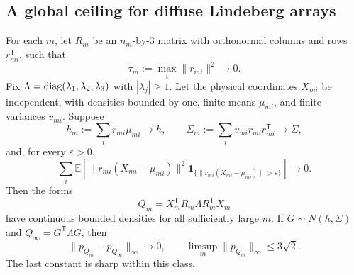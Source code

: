 \subsection{A global ceiling for diffuse Lindeberg arrays}

\begin{theorem}
\label{bench:lindeberg}
For each \(m\), let \(R_m\) be an \(n_m\)-by-\(3\) matrix with
orthonormal columns and rows \(r_{mi}^{\mathsf T}\), such that
\[
 \tau_m:=\max_i\|r_{mi}\|^2\longrightarrow0.
\]
Fix \(\Lambda=\operatorname{diag}(\lambda_1,\lambda_2,\lambda_3)\) with
\(|\lambda_j|\geq1\).  Let the physical coordinates \(X_{mi}\) be
independent, with densities bounded by one, finite means \(\mu_{mi}\),
and finite variances \(v_{mi}\).  Suppose
\begin{equation}\label{bench:lindeberg-limits}
 h_m:=\sum_i r_{mi}\mu_{mi}\longrightarrow h,\qquad
 \Sigma_m:=\sum_i v_{mi}r_{mi}r_{mi}^{\mathsf T}
                        \longrightarrow\Sigma,
\end{equation}
and, for every \(\varepsilon>0\),
\begin{equation}\label{bench:lindeberg-condition}
 \sum_i\mathbb E\left[
   \|r_{mi}(X_{mi}-\mu_{mi})\|^2
   \mathbf1_{\{\|r_{mi}(X_{mi}-\mu_{mi})\|>\varepsilon\}}
                  \right]\longrightarrow0.
\end{equation}
Then the forms
\[
 Q_m=X_m^{\mathsf T}R_m\Lambda R_m^{\mathsf T}X_m
\]
have continuous bounded densities for all sufficiently large \(m\).
If \(G\sim N(h,\Sigma)\) and \(Q_\infty=G^{\mathsf T}\Lambda G\),
then
\begin{equation}\label{bench:uniform-limit}
 \|p_{Q_m}-p_{Q_\infty}\|_\infty\longrightarrow0,
 \qquad
 \limsup_m\|p_{Q_m}\|_\infty\leq3\sqrt2.
\end{equation}
The last constant is sharp within this class.
\end{theorem}
